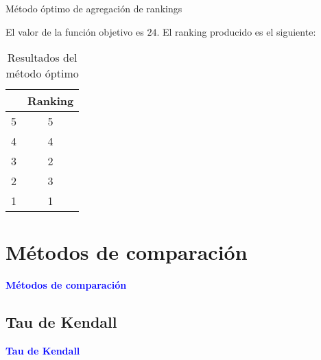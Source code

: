 \documentclass[10pt,hyperref={unicode}]{beamer}
\begin{document}
	\begin{frame}{Método óptimo de agregación de rankings}
		\begin{ejemplo}[continuación]
			
			El valor de la función objetivo es $24$. El ranking producido es el siguiente:
			
			\begin{table}[h]
				\centering
				\caption{Resultados del método óptimo}
				\label{tbl:optimo_resultados}
				\begin{tabular}{@{}cc@{}}
					\cmidrule(l){2-2}
					& Ranking \\ \midrule
					5 & 5       \\
					4 & 4       \\
					3 & 2       \\
					2 & 3       \\
					1 & 1       \\ \bottomrule
				\end{tabular}
			\end{table}
			
			
		\end{ejemplo}
	\end{frame}
	
	\section{Métodos de comparación}
	
	\begin{frame}
		\begin{center}
			\Huge\textbf{\textsf{\textcolor{blue}{Métodos de comparación}}}
		\end{center}
	\end{frame}
	
	\subsection{Tau de Kendall}
	
	\begin{frame}
		\begin{center}
			\Huge\textbf{\textsf{\textcolor{blue}{Tau de Kendall}}}
		\end{center}
	\end{frame}
	
\end{document}
